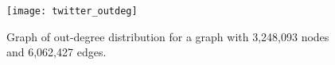 
\begin{figure}
  \centering
  \texttt{[image: twitter\_outdeg]}
  \caption{Graph of out-degree distribution for a graph with 3,248,093 nodes and
    6,062,427 edges.}
  \label{fig:twitter-outdeg}
\end{figure}

